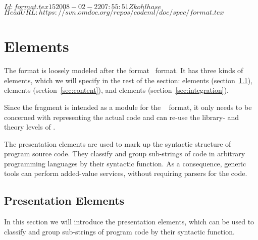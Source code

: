 \svnInfo $Id: format.tex 15 2008-02-22 07:55:51Z kohlhase $
\svnKeyword $HeadURL: https://svn.omdoc.org/repos/codeml/doc/spec/format.tex $
\chapter{{\codeml} Elements}\label{chap:codeml}

The {\codeml} format is loosely modeled after the {\mathml}
format~\cite{CarIon:MathML01} format. It has three kinds of elements, which we
will specify in the rest of the section: {}
elements (section~\ref{sec:presentation}), {}
elements (section~\ref{sec:content}), and {}
elements (section~\ref{sec:integration}).

Since the {\codeml} fragment is intended as a module for the
{\omdoc}~\cite{Kohlhase:omfmd01} format, it only needs to be concerned with
representing the actual code and can re-use the library- and theory levels of
{\omdoc}.

The {\codeml} presentation elements are used to mark up the syntactic structure of
program source code. They classify and group sub-strings of code in arbitrary
programming languages by their syntactic function. As a consequence, generic tools
can perform added-value services, without requiring parsers for the
code.

\section{Presentation Elements}\label{sec:presentation}

In this section we will introduce the {\codeml} presentation elements, which can
be used to classify and group sub-strings of program code by their syntactic
function. 


